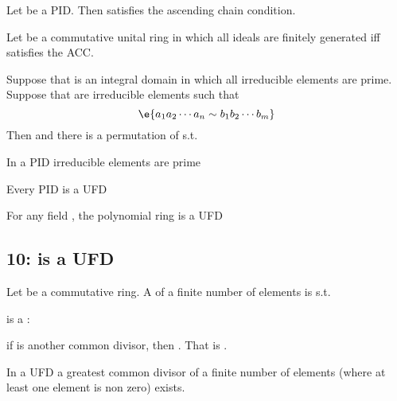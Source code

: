 \begin{Le}
\begin{Le} Let  be a PID. Then  satisfies the ascending chain condition. \end{Le}

\begin{Le} Let  be a commutative unital ring in which all ideals are finitely generated iff  satisfies the ACC.\end{Le}

\begin{Le} Suppose that  is an integral domain in which all irreducible elements are prime. Suppose that  are irreducible elements such that 
$$\e{a_1a_2\cdots a_n\sim b_1b_2\cdots b_m}$$
Then  and there is a permutation \e{$\pi$} of s.t. 
\end{Le}

\begin{Le} In a PID irreducible elements are prime \end{Le}

\begin{T} Every PID is a UFD \end{T}

\begin{C} For any field , the polynomial ring  is a UFD \end{C}

\subsection{ 10:  is a UFD}
\begin{D}
Let  be a commutative ring. A  of a finite number of elements  is  s.t.
\begin{compactitem}
\item {} is a :  
\item if  is another common divisor, then . That is .
\end{compactitem}
\end{D}
 
\begin{Le} In a UFD a greatest common divisor of a finite number of elements (where at least one element is non zero) exists. \end{Le}


\end{Le}
